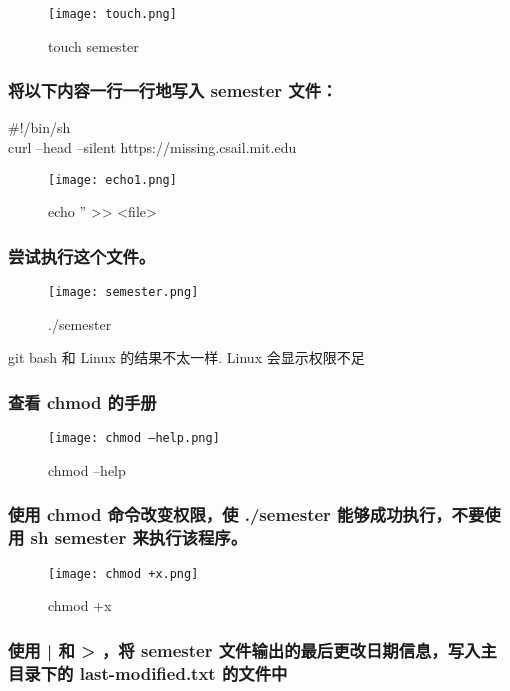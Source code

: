 \documentclass{ctexart}
\begin{document}
\begin{figure}[H]
    \centering
    \texttt{[image: touch.png]}
    \caption{touch semester}
    \label{fig:enter-label}
\end{figure}

\subsubsection{将以下内容一行一行地写入 semester 文件：}
 \#!/bin/sh \\
 curl --head --silent https://missing.csail.mit.edu \\
\begin{figure}[H]
    \centering
    \texttt{[image: echo1.png]}
    \caption{echo '' >> <file>}
    \label{fig:enter-label}
\end{figure}

\subsubsection{尝试执行这个文件。}
\begin{figure}[h]
    \centering
    \texttt{[image: semester.png]}
    \caption{./semester}
    \label{fig:enter-label}
\end{figure}
git bash 和 Linux 的结果不太一样. Linux 会显示权限不足

\subsubsection{查看 chmod 的手册}
\begin{figure}[H]
    \centering
    \texttt{[image: chmod --help.png]}
    \caption{chmod --help}
    \label{fig:enter-label}
\end{figure}

\subsubsection{使用 chmod 命令改变权限，使 ./semester 能够成功执行，不要使用 sh semester 来执行该程序。}

\begin{figure}[h]
    \centering
    \texttt{[image: chmod +x.png]}
    \caption{chmod +x}
    \label{fig:enter-label}
\end{figure}

\subsubsection{使用 | 和 > ，将 semester 文件输出的最后更改日期信息，写入主目录下的 last-modified.txt 的文件中}
\end{document}
